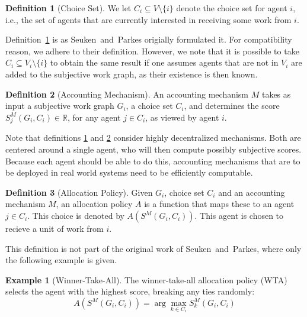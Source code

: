 \documentclass[a4paper,11pt]{book}
\newcommand{\bb}{\mathbb}
\theoremstyle{definition}
\newtheorem{definition}{Definition}
\newtheorem*{example}{Example}
\begin{document}
\begin{definition}[Choice Set]
    We let $C_i \subseteq V \setminus \{i\}$ denote the choice set for agent $i$, i.e., the set of agents that
    are currently interested in receiving some work from $i$.
    \label{def:choice_set}
\end{definition}

Definition~\ref{def:choice_set} is as Seuken~and~Parkes origially formulated it. For compatibility reason,
we adhere to their definition. However, we note that it is possible to take $C_i \subseteq V_i \setminus \{i\}$
to obtain the same result if one assumes agents that are not in $V_i$ are added to the subjective work graph,
as their existence is then known.

\begin{definition}[Accounting Mechanism]
   An accounting mechanism $M$ takes as input a subjective work graph $G_i$, a choice set $C_i$, and
   determines the score $S_j^M(G_i, C_i) \in \bb{R}$, for any agent $j \in C_i$, as viewed by agent
   $i$.
   \label{def:acc_mech}
\end{definition}

Note that definitions \ref{def:choice_set} and \ref{def:acc_mech} consider highly decentralized mechanisms.
Both are centered around a single agent, who will then compute possibly subjective scores. Because each
agent should be able to do this, accounting mechanisms that are to be deployed in real world systems need
to be efficiently computable. 

\begin{definition}[Allocation Policy]
    Given $G_i$, choice set $C_i$ and an accounting mechanism $M$, an allocation policy $A$
    is a function that maps these to an agent $j \in C_i$. This choice is denoted
    by $A(S^M(G_i, C_i))$. This agent is chosen to recieve a unit of work from $i$.
    \label{def:all_pol}
\end{definition}

This definition is not part of the original work of Seuken~and~Parkes,
where only the following example is given.

\begin{example}[Winner-Take-All]
   The winner-take-all allocation policy (WTA) selects the agent with the highest score,
   breaking any ties randomly:
   \begin{equation*}
       A(S^M(G_i, C_i)) = \arg \max_{k\in C_i} S_k^M(G_i, C_i) 
   \end{equation*}
\end{example}
\end{document}
